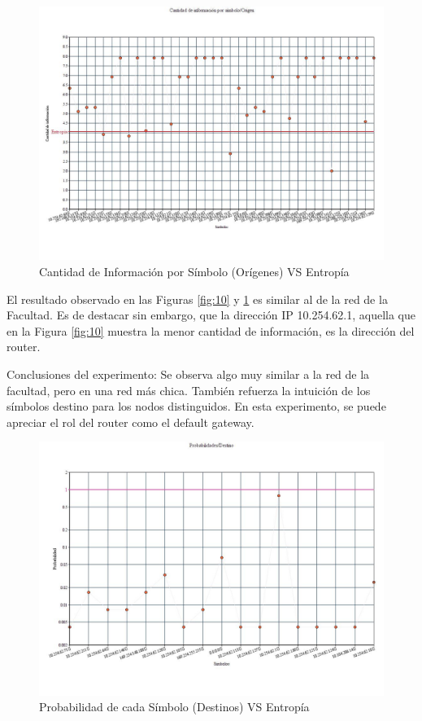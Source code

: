 \begin{figure}[H]
  \centering
    \includegraphics[scale=0.45]{imagenes/graficos/entropiaCantInf/04origen.jpg}
  \caption{Cantidad de Información por Símbolo (Orígenes) VS Entropía}
  \label{fig:11}
\end{figure}

El resultado observado en las Figuras \ref{fig:10} y \ref{fig:11} es similar al de la red de la Facultad. Es de destacar sin embargo, que la dirección IP 10.254.62.1, aquella que en la Figura \ref{fig:10} muestra la menor cantidad de información, es la dirección del router.

Conclusiones del experimento: Se observa algo muy similar a la red de la facultad, pero en una red más chica. También refuerza la intuición de los símbolos destino para los nodos distinguidos. En esta experimento, se puede apreciar el rol del router como el default gateway.

\begin{figure}[H]
  \centering
    \includegraphics[scale=0.45]{imagenes/graficos/Probabilidades/04destino.jpg}
  \caption{Probabilidad de cada Símbolo (Destinos) VS Entropía}
  \label{fig:12}
\end{figure}

